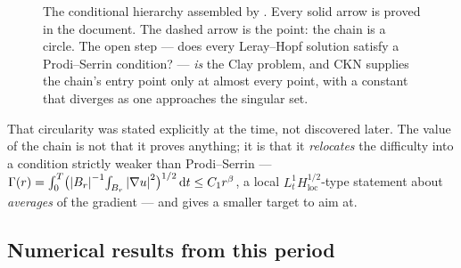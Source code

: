 \begin{figure}[ht]
\centering
{}
\caption[The conditional hierarchy of ]{The conditional hierarchy
assembled by . Every solid arrow is proved in the document. The dashed
arrow is the point: the chain is a circle. The open step --- does every
Leray--Hopf solution satisfy a Prodi--Serrin condition? --- \emph{is} the Clay
problem, and CKN supplies the chain's entry point only at almost every point,
with a constant that diverges as one approaches the singular set.}
\label{fig:hierarchy-s25}
\end{figure}

That circularity was stated explicitly at the time, not discovered later. The
value of the chain is not that it proves anything; it is that it \emph{relocates}
the difficulty into a condition strictly weaker than Prodi--Serrin ---
\(\Gamma(r)=\int_0^T\bigl(\left|B_r\right|^{-1}\!\int_{B_r}\left|\nabla u\right|^2\bigr)^{1/2}\,\mathrm{d} t\le C_1r^\beta\), a
local \(L^1_tH^{1/2}_{\mathrm{loc}}\)-type statement about \emph{averages} of
the gradient --- and gives a smaller target to aim at.

\subsection{Numerical results from this period}

